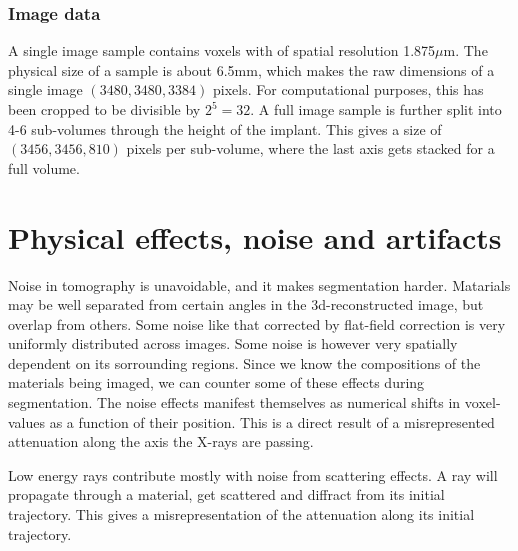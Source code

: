 

\subsubsection*{Image data}

A single image sample contains voxels with of spatial resolution 1.875$\mu$m. The physical size of
a sample is about 6.5mm, which makes the raw dimensions of a single image $(3480,3480,3384)$ pixels.
For computational purposes, this has been cropped to be divisible by $2^5=32$. A full image sample
is further split into 4-6 sub-volumes through the height of the implant. This gives a size of $(3456,3456,810)$ pixels per sub-volume, where the last axis gets stacked for a full volume.



\section*{Physical effects, noise and artifacts}

Noise in tomography is unavoidable, and it makes segmentation harder. Matarials may be well separated from certain angles in the 3d-reconstructed image, but overlap from others. Some noise like that corrected by flat-field correction is very uniformly distributed across images. Some noise is however very spatially dependent on its sorrounding regions. Since we know the compositions of the materials being imaged, we can counter some of these effects during segmentation. The noise effects manifest themselves as numerical shifts in voxel-values as a function of their position. This is a direct result of a misrepresented attenuation along the axis the X-rays are passing. 


Low energy rays contribute mostly with noise from scattering effects. A ray will propagate through a material, get scattered and diffract from its initial trajectory. This gives a misrepresentation of the attenuation along its initial trajectory.

